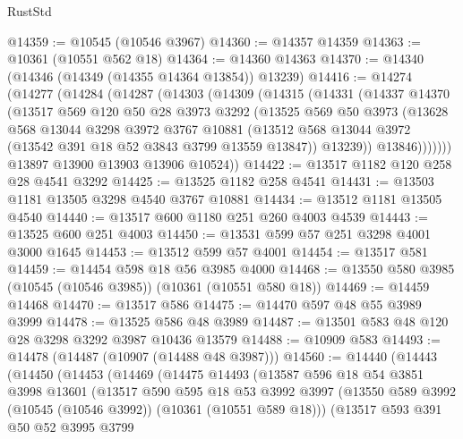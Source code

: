 \begin{lexlean}{RustStd}
\begin{coremodule}
@14359 := @10545 (@10546 @3967)
@14360 := @14357 @14359
@14363 := @10361 (@10551 @562 @18)
@14364 := @14360 @14363
@14370 := @14340 (@14346 (@14349 (@14355 @14364 @13854)) @13239)
@14416 := @14274
    (@14277
      (@14284
        (@14287
          (@14303
            (@14309
              (@14315
                (@14331
                  (@14337
                    @14370
                    (@13517
                      @569
                      @120
                      @50
                      @28
                      @3973
                      @3292
                      (@13525
                        @569
                        @50
                        @3973
                        (@13628
                          @568
                          @13044
                          @3298
                          @3972
                          @3767
                          @10881
                          (@13512 @568 @13044 @3972 (@13542 @391 @18 @52 @3843 @3799 @13559 @13847))
                          @13239))
                      @13846)))))))
        @13897
        @13900
        @13903
        @13906
        @10524))
@14422 := @13517 @1182 @120 @258 @28 @4541 @3292
@14425 := @13525 @1182 @258 @4541
@14431 := @13503 @1181 @13505 @3298 @4540 @3767 @10881
@14434 := @13512 @1181 @13505 @4540
@14440 := @13517 @600 @1180 @251 @260 @4003 @4539
@14443 := @13525 @600 @251 @4003
@14450 := @13531 @599 @57 @251 @3298 @4001 @3000 @1645
@14453 := @13512 @599 @57 @4001
@14454 := @13517 @581
@14459 := @14454 @598 @18 @56 @3985 @4000
@14468 := @13550 @580 @3985 (@10545 (@10546 @3985)) (@10361 (@10551 @580 @18))
@14469 := @14459 @14468
@14470 := @13517 @586
@14475 := @14470 @597 @48 @55 @3989 @3999
@14478 := @13525 @586 @48 @3989
@14487 := @13501 @583 @48 @120 @28 @3298 @3292 @3987 @10436 @13579
@14488 := @10909 @583
@14493 := @14478 (@14487 (@10907 (@14488 @48 @3987)))
@14560 := @14440
    (@14443
      (@14450
        (@14453
          (@14469
            (@14475
              @14493
              (@13587
                @596
                @18
                @54
                @3851
                @3998
                @13601
                (@13517
                  @590
                  @595
                  @18
                  @53
                  @3992
                  @3997
                  (@13550 @589 @3992 (@10545 (@10546 @3992)) (@10361 (@10551 @589 @18)))
                  (@13517
                    @593
                    @391
                    @50
                    @52
                    @3995
                    @3799

\end{coremodule}
\end{lexlean}
